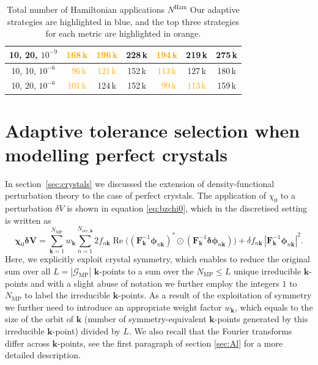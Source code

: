 \documentclass[hidelinks,onefignum,onetabnum]{siamart250211}
\newcommand{\Real}{\operatorname{Re}}
\newcommand{\Nocck}{N_{\mathrm{occ},\bm{k}}}
\newcommand{\Nham}{N^{\mathrm{Ham}}}
\newcommand{\mpgrid}{\mathcal{G}_\text{MP}}
\newcommand{\Nmp}{N_{\text{MP}}}
\begin{document}
\begin{table}[H]
\begin{tabular}{c|ccc|ccc}
      10, 20, $10^{-9}$                    & \textcolor{orange}{168\,k}                    & \textcolor{orange}{196\,k}                    & 228\,k                                        & \textcolor{orange}{194\,k}                    & 219\,k                     & 275\,k                    \\
        \midrule
      10, 10, $10^{-6}$                    & \textcolor{white}{0}\textcolor{orange}{96\,k} & \textcolor{orange}{121\,k}                    & 152\,k                                        & \textcolor{orange}{113\,k}                    & 127\,k                     & 180\,k                    \\
      10, 20, $10^{-6}$                    & \textcolor{orange}{101\,k}                    & 124\,k                                        & 152\,k                                        & \textcolor{white}{0}\textcolor{orange}{99\,k}                     & \textcolor{orange}{113\,k} & 159\,k                    \\
      \bottomrule
  \end{tabular}
  \caption{Total number of Hamiltonian applications $\Nham$ 
  Our adaptive strategies are highlighted in blue, 
  and the top three strategies for each metric are
  highlighted in orange.}
  \label{tab:summary_Al_cg}
\end{table}

\section{Adaptive tolerance selection when modelling perfect crystals}
\label{supp:perfect_crystals}
In section~\ref{sec:crystals} we discussed the extension of
density-functional perturbation theory to the case of perfect crystals.
The application of $\chi_0$ to a perturbation $\delta V$ is shown
in equation \eqref{eq:bzchi0}, which in the discretised setting is written as
\begin{equation}
    \label{eq:kchi0}
  \bm \chi_0 \bm{\delta V}
  = \sum_{\bm k =1}^{\Nmp} w_{\bm k} \sum_{n=1}^{\Nocck} 2 f_{n\bm k} \Real \Big( (\bm F_{\bm k}^{-1}\bm{\phi}_{n\bm k})^* \odot ( \bm F_{\bm k}^{-1} \bm{\delta \phi}_{n\bm k}) \Big) + \delta f_{n\bm k} \, \left| \bm F_{\bm k}^{-1} \bm{\phi}_{n \bm k} \right|^2.
\end{equation}
Here, we explicitly exploit crystal symmetry,
which enables to reduce the original sum over all $L = |\mpgrid|$ $\bm k$-points
to a sum over the $\Nmp \leq L$ unique irreducible $\bm k$-points
and with a slight abuse of notation we further employ the integers
$1$ to $\Nmp$ to label the irreducible $\bm k$-points.
%
As a result of the exploitation of symmetry we further need to introduce
an appropriate weight factor $w_{\bm k}$,
which equals to the size of the orbit of $\bm k$
(number of symmetry-equivalent $\bm k$-points generated by this irreducible $\bm k$-point)
divided by $L$. We also recall that the Fourier
transforms differ across $\bm k$-points, see the first paragraph 
of section \ref{sec:Al} for a more detailed description.
\end{document}
